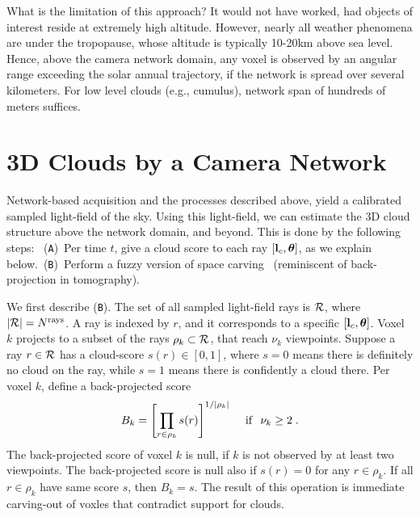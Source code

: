 \documentclass[runningheads]{llncs}
\begin{document}
What is the limitation of this approach? It would not have worked, had objects of interest reside at extremely high altitude. However, nearly all weather phenomena are under the tropopause, whose altitude is typically 10-20km above sea level. Hence, above the camera network domain, any voxel is observed by an angular range exceeding the solar annual trajectory, if the network is spread over several kilometers. For low level clouds (e.g., cumulus), network span of hundreds of meters suffices.


\section{3D Clouds by a Camera Network}
\label{sec:3Dc}

Network-based acquisition and the processes described above, yield a calibrated sampled light-field of the sky. Using this light-field, we can estimate the 3D cloud structure above the network domain, and beyond. This is done by the following steps:~ %
({\tt A})~Per time $t$, give a {\rm cloud score} to each ray $[{\bf l}_c,{\bm \theta}]$, as we explain below.~({\tt B})~Perform a fuzzy version of space carving~\cite{Kutulakos2000} (reminiscent of back-projection in tomography).

We first describe ({\tt B}).  The set of all sampled light-field rays is ${\cal R}$, where
\mbox{$|{\cal R}|=N^{\rm rays}$}. A ray is indexed by $r$, and it corresponds to a specific $[{\bf l}_c,{\bm \theta}]$. Voxel $k$ projects to a subset of the rays $\rho_k\subset{\cal R}$,
that reach $\nu_k$ viewpoints. Suppose a ray $r\in{\cal R}$ has a cloud-score $s(r)\in[0,1]$, where $s=0$ means there is definitely no cloud on the ray, while $s=1$ means there is confidently a cloud there. Per voxel $k$, define a back-projected score
\begin{equation}
 B_k= \left[ \prod_{r\in\rho_k} s(r)\right]^{1/|\rho_k|}
 \;\; ~~{\rm if}~~ \nu_k\geq 2
  \;.
 \label{eq:Bk}
\end{equation}
The back-projected score of voxel $k$ is null, if $k$ is not observed by at least two viewpoints. The back-projected score is null also if $s(r)=0$ for any $r\in\rho_k$. If all $r\in\rho_k$ have same score $s$, then $B_k=s$. The result of this operation is immediate carving-out of voxles that contradict  support for clouds.
\end{document}
